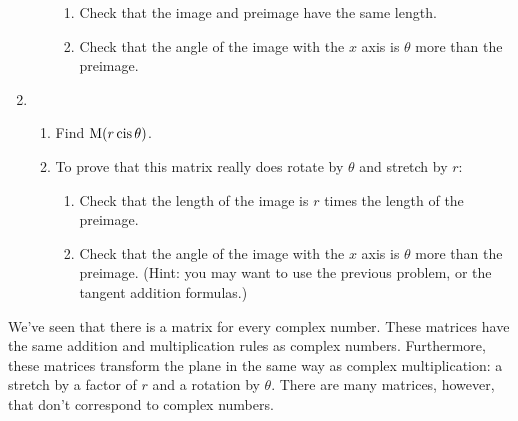 \documentclass[../textbook.tex]{subfiles}
\begin{document}
\begin{enumerate}
\begin{enumerate}
\begin{enumerate}
\item Check that the image and preimage have the same length.
\item Check that the angle of the image with the $x$ axis is $\theta$ more than the preimage.
\end{enumerate}
\end{enumerate}
\item \begin{enumerate}
\item Find $\operatorname{M} (r\operatorname{cis}\theta)$.
\item To prove that this matrix really does rotate by $\theta$ and stretch by $r$:
\begin{enumerate}
\item Check that the length of the image is $r$ times the length of the preimage.
\item Check that the angle of the image with the $x$ axis is $\theta$ more than the preimage. (Hint: you may want to use the previous problem, or the tangent addition formulas.)
\end{enumerate}
\end{enumerate}
\setcounter{problem_i}{\value{enumi}}
\end{enumerate}

\noindent We've seen that there is a matrix for every complex number. These matrices have the same addition and multiplication rules as complex numbers. Furthermore, these matrices transform the plane in the same way as complex multiplication: a stretch by a factor of $r$ and a rotation by $\theta$. There are many matrices, however, that don't correspond to complex numbers.
\end{document}
